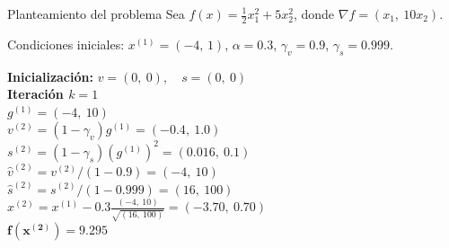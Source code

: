 \begin{cajaejemplo}{Planteamiento del problema}
    Sea $f(x)=\tfrac12x_1^2+5x_2^2$, donde $\nabla f=(x_1,\ 10x_2)$.
    
    Condiciones iniciales: $x^{(1)}=(-4,\,1)$, $\alpha=0.3$, $\gamma_v=0.9$, $\gamma_s=0.999$.
\end{cajaejemplo}

\noindent
\begin{minipage}[c]{0.55\textwidth}
    \textbf{Inicialización:} $v=(0,\ 0), \quad s=(0,\ 0)$ \\[0.5em]
    \textbf{Iteración $k=1$} \\
    $g^{(1)}=(-4,\ 10)$ \\
    $v^{(2)}=(1-\gamma_v)g^{(1)}=(-0.4,\ 1.0)$ \\
    $s^{(2)}=(1-\gamma_s)(g^{(1)})^2=(0.016,\ 0.1)$ \\
    $\hat{v}^{(2)}=v^{(2)}/(1-0.9)=(-4,\ 10)$ \\
    $\hat{s}^{(2)}=s^{(2)}/(1-0.999)=(16,\ 100)$ \\
    $x^{(2)}=x^{(1)} - 0.3 \frac{(-4,\ 10)}{\sqrt{(16,\ 100)}} = (-3.70,\ 0.70)$ \\
    $\mathbf{f(x^{(2)})=9.295}$
\end{minipage}%
\hfill
\begin{minipage}[c]{0.4\textwidth}
    \centering
\end{minipage}
\vspace{1em}

